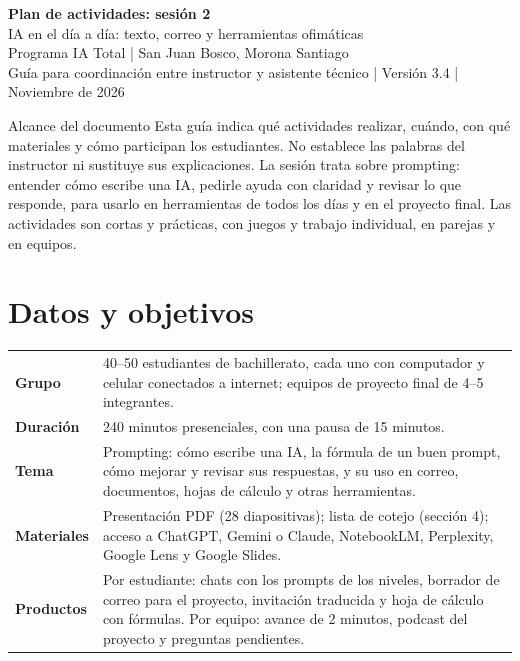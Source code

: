 \documentclass[11pt,a4paper]{article}
\begin{document}
\begin{center}
{\Huge\sffamily\bfseries Plan de actividades: sesión 2}\\[6pt]
{\Large IA en el día a día: texto, correo y herramientas ofimáticas}\\[5pt]
{\large Programa IA Total | San Juan Bosco, Morona Santiago}\\[8pt]
{\small Guía para coordinación entre instructor y asistente técnico | Versión 3.4 | Noviembre de 2026}
\end{center}
\begin{actividad}{Alcance del documento}
Esta guía indica qué actividades realizar, cuándo, con qué materiales y cómo participan los estudiantes. No establece las palabras del instructor ni sustituye sus explicaciones. La sesión trata sobre prompting: entender cómo escribe una IA, pedirle ayuda con claridad y revisar lo que responde, para usarlo en herramientas de todos los días y en el proyecto final. Las actividades son cortas y prácticas, con juegos y trabajo individual, en parejas y en equipos.
\end{actividad}

\section{Datos y objetivos}
\noindent\begin{tabularx}{\textwidth}{@{}p{3.3cm}X@{}}\toprule
\textbf{Grupo} & 40--50 estudiantes de bachillerato, cada uno con computador y celular conectados a internet; equipos de proyecto final de 4--5 integrantes.\\
\textbf{Duración} & 240 minutos presenciales, con una pausa de 15 minutos.\\
\textbf{Tema} & Prompting: cómo escribe una IA, la fórmula de un buen prompt, cómo mejorar y revisar sus respuestas, y su uso en correo, documentos, hojas de cálculo y otras herramientas.\\
\textbf{Materiales} & Presentación PDF (28 diapositivas); lista de cotejo (sección 4); acceso a ChatGPT, Gemini o Claude, NotebookLM, Perplexity, Google Lens y Google Slides.\\
\textbf{Productos} & Por estudiante: chats con los prompts de los niveles, borrador de correo para el proyecto, invitación traducida y hoja de cálculo con fórmulas. Por equipo: avance de 2 minutos, podcast del proyecto y preguntas pendientes.\\\bottomrule
\end{tabularx}
\end{document}
